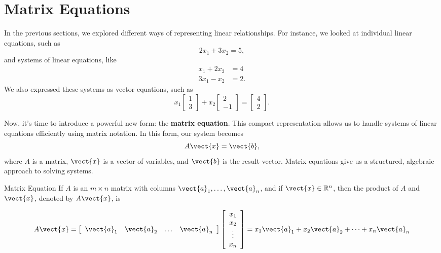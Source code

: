 \section{Matrix Equations}
In the previous sections, we explored different ways of representing linear relationships. For instance, we looked at individual linear equations, such as  
\[
2x_1 + 3x_2 = 5,
\]
and systems of linear equations, like  
\[
\begin{aligned}
x_1 + 2x_2 &= 4 \\
3x_1 - x_2 &= 2.
\end{aligned}
\]
We also expressed these systems as vector equations, such as  
\[
x_1 \begin{bmatrix} 1 \\ 3 \end{bmatrix} + x_2 \begin{bmatrix} 2 \\ -1 \end{bmatrix} = \begin{bmatrix} 4 \\ 2 \end{bmatrix}.
\]

Now, it's time to introduce a powerful new form: the \textbf{matrix equation}. This compact representation allows us to handle systems of linear equations efficiently using matrix notation. In this form, our system becomes  
\[
A \vect{x} = \vect{b},
\]
where \(A\) is a matrix, \(\vect{x}\) is a vector of variables, and \(\vect{b}\) is the result vector. Matrix equations give us a structured, algebraic approach to solving systems.

\begin{definition}{Matrix Equation}
  If $A$ is an $m \times n$ matrix with columns $\vect{a}_1, \ldots, \vect{a}_n$, and if $\vect{x} \in \mathbb{R}^n$, then the product of $A$ and $\vect{x}$, denoted by $A \vect{x}$, is

\[
A \vect{x} = \left[\begin{array}{llll}
\vect{a}_1 & \vect{a}_2 & \ldots & \vect{a}_n
\end{array}\right] \left[\begin{array}{c}
x_1 \\
x_2 \\
\vdots \\
x_n
\end{array}\right] = x_1 \vect{a}_1 + x_2 \vect{a}_2 + \cdots + x_n \vect{a}_n
\]
    
\end{definition}

